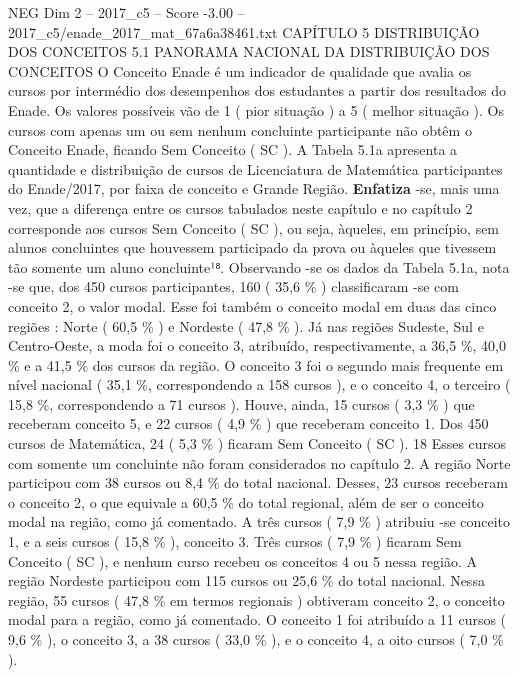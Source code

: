 \begin{textsample}{NEG Dim 2 – 2017\_c5 – Score -3.00 – 2017\_c5/enade\_2017\_mat\_67a6a38461.txt}  \label{ex:f2_neg_041}
CAPÍTULO 5 DISTRIBUIÇÃO DOS CONCEITOS 5.1 PANORAMA NACIONAL DA DISTRIBUIÇÃO DOS CONCEITOS O Conceito Enade é um indicador de qualidade que avalia os cursos por intermédio dos desempenhos dos estudantes a partir dos resultados do Enade.
Os valores possíveis vão de 1 ( pior situação ) a 5 ( melhor situação ).
Os cursos com apenas um ou sem nenhum concluinte participante não obtêm o Conceito Enade, ficando Sem Conceito ( SC ).
A Tabela 5.1a apresenta a quantidade e distribuição de cursos de Licenciatura de Matemática participantes do Enade/2017, por faixa de conceito e Grande Região. \textbf{Enfatiza} -se, mais uma vez, que a diferença entre os cursos tabulados neste capítulo e no capítulo 2 corresponde aos cursos Sem Conceito ( SC ), ou seja, àqueles, em princípio, sem alunos concluintes que houvessem participado da prova ou àqueles que tivessem tão somente um aluno concluinte¹⁸.
Observando -se os dados da Tabela 5.1a, nota -se que, dos 450 cursos participantes, 160 ( 35,6 \% ) classificaram -se com conceito 2, o valor modal.
Esse foi também o conceito modal em duas das cinco regiões : Norte ( 60,5 \% ) e Nordeste ( 47,8 \% ).
Já nas regiões Sudeste, Sul e Centro-Oeste, a moda foi o conceito 3, atribuído, respectivamente, a 36,5 \%, 40,0 \% e a 41,5 \% dos cursos da região.
O conceito 3 foi o segundo mais frequente em nível nacional ( 35,1 \%, correspondendo a 158 cursos ), e o conceito 4, o terceiro ( 15,8 \%, correspondendo a 71 cursos ).
Houve, ainda, 15 cursos ( 3,3 \% ) que receberam conceito 5, e 22 cursos ( 4,9 \% ) que receberam conceito 1.
Dos 450 cursos de Matemática, 24 ( 5,3 \% ) ficaram Sem Conceito ( SC ). 18 Esses cursos com somente um concluinte não foram considerados no capítulo 2.
A região Norte participou com 38 cursos ou 8,4 \% do total nacional.
Desses, 23 cursos receberam o conceito 2, o que equivale a 60,5 \% do total regional, além de ser o conceito modal na região, como já comentado.
A três cursos ( 7,9 \% ) atribuiu -se conceito 1, e a seis cursos ( 15,8 \% ), conceito 3.
Três cursos ( 7,9 \% ) ficaram Sem Conceito ( SC ), e nenhum curso recebeu os conceitos 4 ou 5 nessa região.
A região Nordeste participou com 115 cursos ou 25,6 \% do total nacional.
Nessa região, 55 cursos ( 47,8 \% em termos regionais ) obtiveram conceito 2, o conceito modal para a região, como já comentado.
O conceito 1 foi atribuído a 11 cursos ( 9,6 \% ), o conceito 3, a 38 cursos ( 33,0 \% ), e o conceito 4, a oito cursos ( 7,0 \% ).

\end{textsample}
